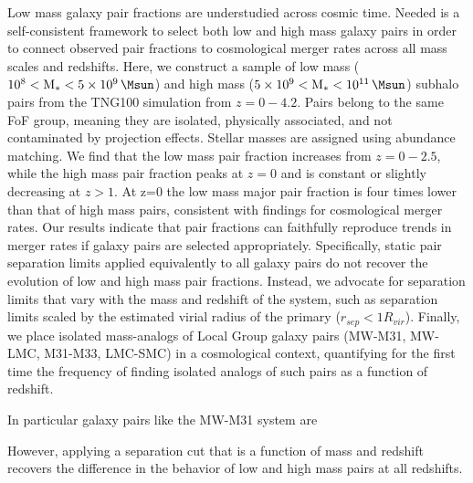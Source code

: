 


Low mass galaxy pair fractions are understudied across cosmic time. Needed is a self-consistent framework to select both low and high mass galaxy pairs in order to connect observed pair fractions to cosmological merger rates across all mass scales and redshifts. Here, we construct a sample of low mass ($\rm 10^8<M_*<5\times10^9\,\Msun$) and high mass ($\rm 5\times10^9<M_*<10^{11}\,\Msun$) subhalo pairs from the TNG100 simulation from $z=0-4.2$. Pairs belong to the same FoF group, meaning they are isolated, physically associated, and not contaminated by projection effects. Stellar masses are assigned using abundance matching. We find that the low mass pair fraction increases from $z=0-2.5$, while the high mass pair fraction peaks at $z=0$ and is constant or slightly decreasing at $z>1$. At z=0 the low mass major pair fraction is four times lower than that of high mass pairs, consistent with findings for cosmological merger rates. Our results indicate that pair fractions can faithfully reproduce trends in merger rates if galaxy pairs are selected appropriately. Specifically, static pair separation limits applied equivalently to all galaxy pairs do not recover the  evolution of low and high mass pair fractions. Instead, we advocate for separation limits that vary with the mass and redshift of the system, such as separation limits scaled by the  estimated virial radius of the primary ($r_{sep}< 1 R_{vir}$). Finally, we place isolated mass-analogs of Local Group galaxy pairs (MW-M31, MW-LMC, M31-M33, LMC-SMC) in a cosmological context, quantifying for the first time the frequency of finding isolated analogs of such pairs as a function of redshift. 


In particular galaxy pairs like the MW-M31 system are 



However, applying a separation cut that is a function of mass and redshift recovers the difference in the behavior of low and high mass pairs at all redshifts. 

